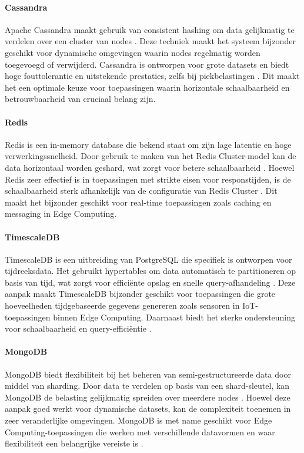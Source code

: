 \paragraph{Cassandra}  
Apache Cassandra maakt gebruik van consistent hashing om data gelijkmatig te verdelen over een cluster van nodes \autocite{CassandraDocumentation}. Deze techniek maakt het systeem bijzonder geschikt voor dynamische omgevingen waarin nodes regelmatig worden toegevoegd of verwijderd. Cassandra is ontworpen voor grote datasets en biedt hoge fouttolerantie en uitstekende prestaties, zelfs bij piekbelastingen \autocite{CassandraDocumentation}. Dit maakt het een optimale keuze voor toepassingen waarin horizontale schaalbaarheid en betrouwbaarheid van cruciaal belang zijn.

\paragraph{Redis}  
Redis is een in-memory database die bekend staat om zijn lage latentie en hoge verwerkingssnelheid. Door gebruik te maken van het Redis Cluster-model kan de data horizontaal worden geshard, wat zorgt voor betere schaalbaarheid \autocite{RedisDocumentation}. Hoewel Redis zeer effectief is in toepassingen met strikte eisen voor responstijden, is de schaalbaarheid sterk afhankelijk van de configuratie van Redis Cluster \autocite{RedisDocumentation}. Dit maakt het bijzonder geschikt voor real-time toepassingen zoals caching en messaging in Edge Computing.

\paragraph{TimescaleDB}  
TimescaleDB is een uitbreiding van PostgreSQL die specifiek is ontworpen voor tijdreeksdata. Het gebruikt hypertables om data automatisch te partitioneren op basis van tijd, wat zorgt voor efficiënte opslag en snelle query-afhandeling \autocite{TimescaleDBDocumentation}. Deze aanpak maakt TimescaleDB bijzonder geschikt voor toepassingen die grote hoeveelheden tijdgebaseerde gegevens genereren zoals sensoren in IoT-toepassingen binnen Edge Computing. Daarnaast biedt het sterke ondersteuning voor schaalbaarheid en query-efficiëntie \autocite{TimescaleDBDocumentation}.

\paragraph{MongoDB}  
MongoDB biedt flexibiliteit bij het beheren van semi-gestructureerde data door middel van sharding. Door data te verdelen op basis van een shard-sleutel, kan MongoDB de belasting gelijkmatig spreiden over meerdere nodes \autocite{MongoDBDocumentation}. Hoewel deze aanpak goed werkt voor dynamische datasets, kan de complexiteit toenemen in zeer veranderlijke omgevingen. MongoDB is met name geschikt voor Edge Computing-toepassingen die werken met verschillende datavormen en waar flexibiliteit een belangrijke vereiste is \autocite{MongoDBDocumentation}.

